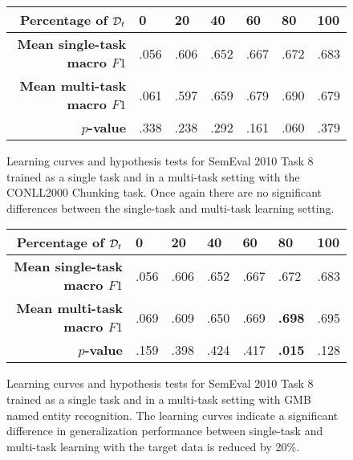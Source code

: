 \begin{figure}
	\centering
	
	\vspace*{1cm}
	
	\begin{tabular}{r | l | l | l | l | l | l}
		\textbf{Percentage of $\mathcal{D}_t$} & 0 & 20 & 40 & 60 & 80 & 100 \\  \hline
		\textbf{Mean single-task macro $F1$} & .056 & .606 & .652 & .667 & .672 & .683\\
		\textbf{Mean multi-task macro $F1$} & .061 & .597 & .659 & .679 & .690 & .679\\
		$p$\textbf{-value} & .338 & .238 & .292 & .161 & .060 & .379
	\end{tabular}
	\caption{Learning curves and hypothesis tests for SemEval 2010 Task 8 trained as a single task and in a multi-task setting with the CONLL2000 Chunking task. Once again there are no significant differences between the single-task and multi-task learning setting.}
\end{figure}
\begin{figure}
	\centering
	
	\vspace*{1cm}
	
	\begin{tabular}{r | l | l | l | l | l | l}
		\textbf{Percentage of $\mathcal{D}_t$} & 0 & 20 & 40 & 60 & 80 & 100 \\  \hline
		\textbf{Mean single-task macro $F1$} & .056 & .606 & .652 & .667 & .672 & .683\\
		\textbf{Mean multi-task macro $F1$} & .069 & .609 & .650 & .669 & \textbf{.698} & .695\\
		$p$\textbf{-value} & .159 & .398 & .424 & .417 & \textbf{.015} & .128
	\end{tabular}
	\caption{Learning curves and hypothesis tests for SemEval 2010 Task 8 trained as a single task and in a multi-task setting with GMB named entity recognition. The learning curves indicate a significant difference in generalization performance between single-task and multi-task learning with the target data is reduced by 20\%.}
\end{figure}
\newpage
